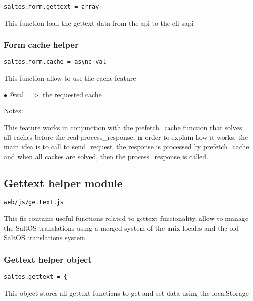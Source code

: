 \documentclass[a4paper]{article}
\begin{document}
\begin{lstlisting}
saltos.form.gettext = array
\end{lstlisting}

This function load the gettext data from the api to the cli sapi

\hypertarget{toc792}{}
\subsubsection{Form cache helper}

\begin{lstlisting}
saltos.form.cache = async val
\end{lstlisting}

This function allow to use the cache feature

\begin{compactitem}
\item[\color{myblue}$\bullet$] @val =$>$ the requested cache
\end{compactitem}

Notes:

This feature works in conjunction with the prefetch\_cache function that
solves all caches before the real process\_response, in order to explain
how it works, the main idea is to call to send\_request, the response is
processed by prefetch\_cache and when all caches are solved, then the
process\_response is called.

\hypertarget{toc793}{}
\subsection{Gettext helper module}

\begin{lstlisting}
web/js/gettext.js
\end{lstlisting}

This fie contains useful functions related to gettext funcionality, allow to manage the
SaltOS translations using a merged system of the unix locales and the old SaltOS translations
system.

\hypertarget{toc794}{}
\subsubsection{Gettext helper object}

\begin{lstlisting}
saltos.gettext = {
\end{lstlisting}

This object stores all gettext functions to get and set data using the localStorage
\end{document}
